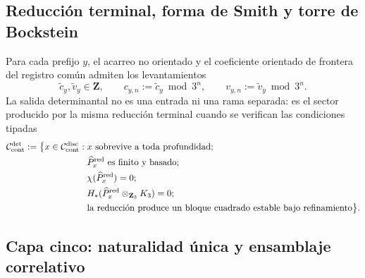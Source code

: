\subsection{Reducción terminal, forma de Smith y torre de Bockstein}
Para cada prefijo \(y\), el acarreo no orientado y el coeficiente orientado
de frontera del registro común admiten los levantamientos
\begin{equation}
\label{eq:detint-c-v-lifts}
 \widetilde c_y,\widetilde v_y\in\mathbf Z,\qquad
 c_{y,n}:=\widetilde c_y\bmod3^n,\qquad
 v_{y,n}:=\widetilde v_y\bmod3^n.
\end{equation}
La salida determinantal no es una entrada ni una rama separada: es el sector
producido por la misma reducción terminal cuando se verifican las condiciones
tipadas
\begin{equation}
\label{eq:detint-dominio}
\begin{split}
 \mathcal C_{\rm cont}^{\rm det}:=\bigl\{x\in\mathcal C_{\rm cont}^{\rm disc}:{}&
 x\text{ sobrevive a toda profundidad};\\
 &\widehat P_x^{\rm red}\text{ es finito y basado};\\
 &\chi(\widehat P_x^{\rm red})=0;\\
 &H_*(\widehat P_x^{\rm red}\otimes_{\mathbf Z_3}K_3)=0;\\
 &\text{la reducción produce un bloque cuadrado estable bajo refinamiento}
 \bigr\}.
\end{split}
\end{equation}
\begingroup
  \let\section\subsection
  
\endgroup

\section{Capa cinco: naturalidad única y ensamblaje correlativo}

